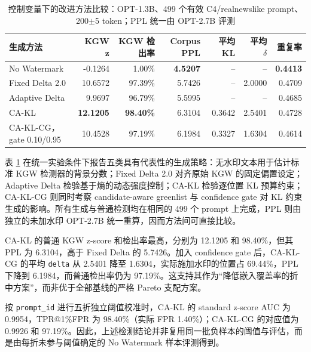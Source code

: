 \documentclass[a4paper,UTF8,zihao=5]{ctexart}
\newcommand{\method}{CA-KL}
\newcommand{\fullmethod}{CA-KL-CG}
\begin{document}
\begin{table}[H]
    \centering
    \caption{控制变量下的改进方法比较：OPT-1.3B、499 个有效 C4/realnewslike prompt、200$\pm$5 token；PPL 统一由 OPT-2.7B 评测}
    \label{tab:improved-results}
    \scriptsize
    \setlength{\tabcolsep}{2.5pt}
    \begin{tabularx}{\textwidth}{p{}rrrrrr}
        \toprule
        生成方法                         & KGW z            & KGW 检出率          & Corpus PPL      & 平均 KL  & 平均 $\delta$ & 重复率             \\
        \midrule
        No Watermark                 & -0.1264          & 1.00\%           & \textbf{4.5207} & --     & --          & \textbf{0.4413} \\
        Fixed Delta 2.0              & 10.6572          & 97.39\%          & 5.7426          & --     & 2.0000      & 0.4709          \\
        Adaptive Delta               & 9.9697           & 96.79\%          & 5.5995          & --     & --          & 0.4685          \\
        \method{}                    & \textbf{12.1205} & \textbf{98.40\%} & 6.3104          & 0.3642 & 2.5401      & 0.4728          \\
        \fullmethod{}，gate 0.10/0.95 & 10.4528          & 97.19\%          & 6.1984          & 0.3327 & 1.6304      & 0.4614          \\
        \bottomrule
    \end{tabularx}
\end{table}

表 \ref{tab:improved-results} 在统一实验条件下报告五类具有代表性的生成策略：无水印文本用于估计标准 KGW 检测器的背景分数；Fixed Delta 2.0 对齐原始 KGW 的固定偏置设定；Adaptive Delta 检验基于熵的动态强度控制；\method{} 检验逐位置 KL 预算约束；\fullmethod{} 则同时考察 candidate-aware greenlist 与 confidence gate 对 KL 约束生成的影响。所有生成与普通检测均在相同的 499 个 prompt 上完成，PPL 则由独立的未加水印 OPT-2.7B 统一重算，因而方法间可直接比较。

\method{} 的普通 KGW z-score 和检出率最高，分别为 12.1205 和 98.40\%，但其 PPL 为 6.3104，高于 Fixed Delta 的 5.7426。加入 confidence gate 后，\fullmethod{} 的平均 \texttt{delta} 从 2.5401 降至 1.6304，实际施加水印的位置占 69.44\%，PPL 下降到 6.1984，而普通检出率仍为 97.19\%。这支持其作为“降低嵌入覆盖率的折中方案”，而非优于全部基线的严格 Pareto 支配方案。

按 \texttt{prompt\_id} 进行五折独立阈值校准时，\method{} 的 standard z-score AUC 为 0.9954，TPR@1\%FPR 为 98.40\%（实际 FPR 1.40\%）；\fullmethod{} 的对应值为 0.9926 和 97.19\%。因此，上述检测结论并非复用同一批负样本的阈值与评估，而是由每折未参与阈值确定的 No Watermark 样本评测得到。
\end{document}
